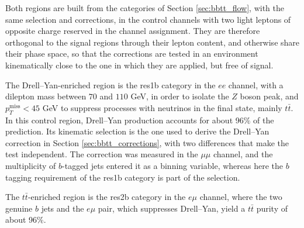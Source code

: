 Both regions are built from the categories of Section \ref{sec:bbtt_flow}, with the same selection and corrections, in the control channels with two light leptons of opposite charge reserved in the channel assignment. They are therefore orthogonal to the signal regions through their lepton content, and otherwise share their phase space, so that the corrections are tested in an environment kinematically close to the one in which they are applied, but free of signal.\medskip

The Drell--Yan-enriched region is the res1b category in the $ee$ channel, with a dilepton mass between $70$ and $110$ GeV, in order to isolate the $Z$ boson peak, and $p_T^\text{miss} < 45$ GeV to suppress processes with neutrinos in the final state, mainly $t\bar{t}$. In this control region, Drell--Yan production accounts for about 96$\%$ of the prediction. Its kinematic selection is the one used to derive the Drell--Yan correction in Section \ref{sec:bbtt_corrections}, with two differences that make the test independent. The correction was measured in the $\mu\mu$ channel, and the multiplicity of $b$-tagged jets entered it as a binning variable, whereas here the $b$ tagging requirement of the res1b category is part of the selection.

The $t\bar{t}$-enriched region is the res2b category in the $e\mu$ channel, where the two genuine $b$ jets and the $e\mu$ pair, which suppresses Drell--Yan, yield a $t\bar{t}$ purity of about 96$\%$.\medskip

